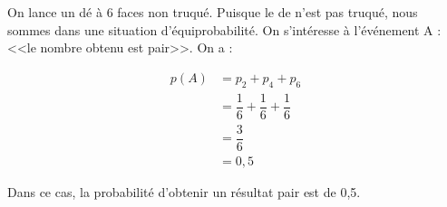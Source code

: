 \begin{myex}
	On lance un dé à 6 faces non truqué. Puisque le de n'est pas truqué, nous sommes dans une situation d'équiprobabilité.
	On s'intéresse à l'événement A : <<le nombre obtenu est pair>>.	On a : 
	
	\begin{align*}
		p(A) &= p_2 + p_4 + p_6 \\
		&= \dfrac{1}{6} + \dfrac{1}{6} + \dfrac{1}{6} \\
		&= \dfrac{3}{6} \\
		&= 0,5
	\end{align*}
	
	Dans ce cas, la probabilité d'obtenir un résultat pair est de 0,5.
\end{myex}